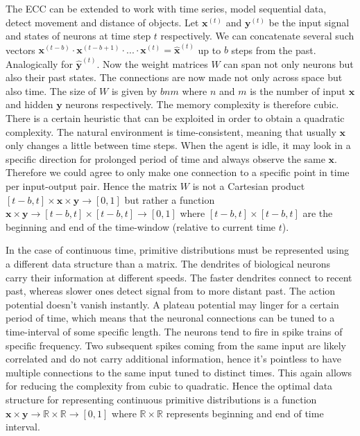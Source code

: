 \documentclass[12pt]{article}
\begin{document}
The ECC can be extended to work with time series, model sequential data, detect movement and distance of objects. Let $\boldsymbol{x}^{(t)}$ and $\boldsymbol{y}^{(t)}$ be the input signal and states of neurons at time step $t$ respectively. We can concatenate several such vectors $\boldsymbol{x}^{(t-b)}\cdot \boldsymbol{x}^{(t-b+1) }\cdot ...\cdot\boldsymbol{x}^{(t)}=\boldsymbol{\hat{x}}^{(t)}$ up to $b$ steps from the past. Analogically for $\boldsymbol{\hat{y}}^{(t)}$. Now the weight matrices $W$ can span not only neurons but also their past states. The connections are now made not only across space but also time. The size of $W$ is given by $bnm$ where $n$ and $m$ is the number of input $\boldsymbol{x}$ and hidden $\boldsymbol{y}$ neurons respectively. The memory complexity is therefore cubic. There is a certain heuristic that can be exploited in order to obtain a quadratic complexity. The natural environment is time-consistent, meaning that usually $\boldsymbol{x}$ only changes a little between time steps. When the agent is idle, it may look in a specific direction for prolonged period of time and always observe the same $\boldsymbol{x}$. Therefore we could agree to only make one connection to a specific point in time per input-output pair. Hence the matrix $W$ is not a Cartesian product $[t-b,t] \times \boldsymbol{x} \times \boldsymbol{y} \rightarrow [0,1]$  but rather a function $\boldsymbol{x} \times \boldsymbol{y} \rightarrow [t-b,t] \times [t-b,t] \rightarrow [0,1]$ where $[t-b,t] \times [t-b,t]$ are the beginning and end of the time-window (relative to current time $t$).

In the case of continuous time, primitive distributions must be represented using a different data structure than a matrix. The dendrites of biological neurons carry their information at different speeds. The faster dendrites connect to recent past, whereas slower ones detect signal from to more distant past. The action potential doesn't vanish instantly. A plateau potential may linger for a certain period of time, which means that the neuronal connections can be tuned to a time-interval of some specific length. The neurons tend to fire in spike trains of specific frequency. Two subsequent spikes coming from the same input are likely correlated and do not carry additional information, hence it's pointless to have multiple connections to the same input tuned to distinct times. This again allows for reducing the complexity from cubic to quadratic. Hence the optimal data structure for representing continuous primitive distributions is a function $\boldsymbol{x} \times \boldsymbol{y} \rightarrow \mathbb{R} \times \mathbb{R} \rightarrow [0,1]$ where $\mathbb{R} \times \mathbb{R}$ represents beginning and end of time interval.
\end{document}
